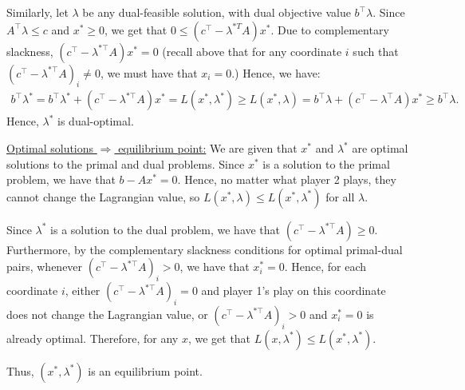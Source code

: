 \documentclass[11pt,letterpaper]{article}
\theoremstyle{definition}
\begin{document}
Similarly, let $\lambda$ be any dual-feasible solution, with dual objective value $b^\top \lambda$.
Since $A^\top \lambda\leq c$ and $x^*\geq 0$, we get that $0\leq(c^\top - \lambda^{*T} A) x^*$.
Due to complementary slackness, $(c^\top - \lambda^{*\top} A) x^*=0$ (recall above that for any coordinate $i$ such that $(c^\top - \lambda^{*\top} A)_i\neq 0$, we must have that $x_i=0$.)
Hence, we have:
\begin{align*}
    b^\top \lambda^*=  b^\top \lambda^* + (c^\top - \lambda^{*\top} A) x^* = L(x^*, \lambda^*) \geq L(x^*,\lambda) = b^\top\lambda + (c^\top - \lambda ^\top A) x^* \geq b^\top \lambda.
\end{align*}
Hence, $\lambda^*$ is dual-optimal.

\ul{Optimal solutions $\Rightarrow$ equilibrium point:}
We are given that $x^*$ and $\lambda^*$ are optimal solutions to the primal and dual problems.
Since $x^*$ is a solution to the primal problem, we have that $b-Ax^*=0$. 
Hence, no matter what player 2 plays, they cannot change the Lagrangian value, so $L(x^*,\lambda)\leq L(x^*,\lambda^*)$ for all $\lambda$.

Since $\lambda^*$ is a solution to the dual problem, we have that $(c^\top - \lambda^{*\top} A)\geq 0$.
Furthermore, by the complementary slackness conditions for optimal primal-dual pairs, whenever $(c^\top - \lambda^{*\top} A)_i>0$, we have that $x^*_i=0$. 
Hence, for each coordinate $i$, either $(c^\top - \lambda^{*\top} A)_i=0$ and player 1's play on this coordinate does not change the Lagrangian value, or $(c^\top - \lambda^{*\top} A)_i>0$ and $x^*_i=0$ is already optimal.
Therefore, for any $x$, we get that $L(x,\lambda^*)\leq L(x^*,\lambda^*)$.

Thus, $(x^*,\lambda^*)$ is an equilibrium point.
\end{document}

